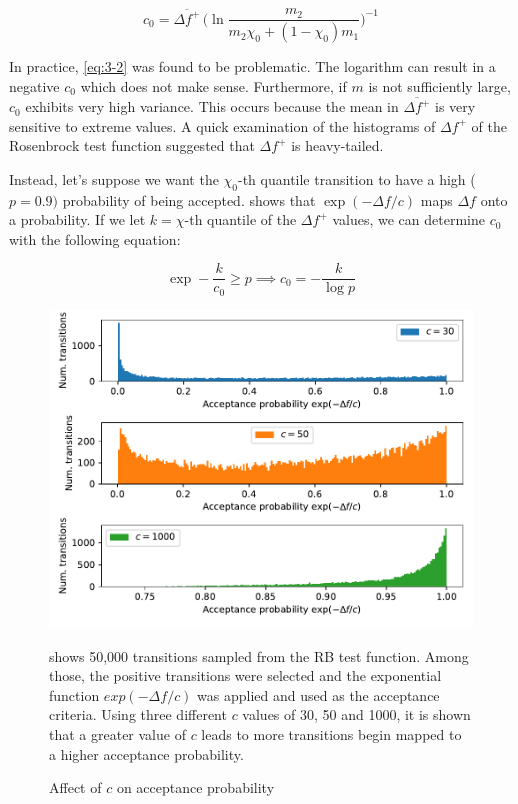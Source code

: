 \begin{equation}
\label{eq:3-2}
    c_0 = \overline{\Delta {f}^+} \, \Bigg(\ln \dfrac{m_2}{m_2 \chi_0+(1-\chi_0)m_1} \Bigg)^{-1} 
\end{equation}

In practice, \cref{eq:3-2} was found to be problematic. The logarithm can result in a negative $c_0$ which does not make sense.
Furthermore, if $m$ is not sufficiently large, $c_0$ exhibits very high variance. This occurs because the mean in 
$\overline{\Delta f^+}$ is very sensitive to extreme values. A quick examination of the histograms of $\Delta f^+$ of the Rosenbrock
test function suggested that $\Delta f^+$ is heavy-tailed.

Instead, let's suppose we want the $\chi_0$-th quantile transition to have a high ($p=0.9)$ probability of being accepted. 
 shows that $\exp (-\Delta f / c)$ maps $\Delta f$ onto a probability. If we let $k=\chi$-th quantile of the
$\Delta f^+$ values, we can determine $c_0$ with the following equation:


\begin{equation}
    \label{eq:schedule_init}
    \exp - \frac{k}{c_0} \geq p \implies c_0 = -\frac{k}{\log p}
\end{equation}

\begin{figure}
    \centering
    \caption{Affect of $c$ on acceptance probability}
    \includegraphics[scale=0.5]{figures/fig33.pdf}
    \label{fig:acceptance}
    
    \vspace{10pt}
    \footnotesize
    \flushleft
    \textbf{} shows 50,000 transitions sampled from the RB test function. Among those, the positive transitions were 
    selected and the exponential function $exp(-\Delta f/c)$  was applied and used as the acceptance criteria. 
    Using three different $c$ values of 30, 50 and 1000, it is shown that a greater value of $c$ leads to more 
    transitions begin mapped to a higher acceptance probability.
\end{figure}

